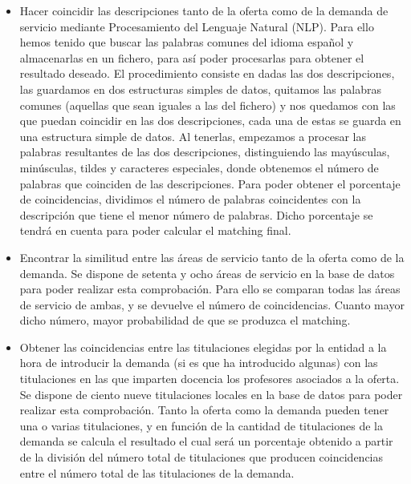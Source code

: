 \documentclass[11pt]{article}
\begin{document}
 \begin{itemize} 	
 	\item Hacer coincidir las descripciones tanto de la oferta como de la demanda de servicio mediante Procesamiento del Lenguaje Natural (NLP).
 Para ello hemos tenido que buscar las palabras comunes del idioma español y almacenarlas en un fichero, para así poder  procesarlas para obtener el resultado deseado. El procedimiento consiste en dadas las dos descripciones, las guardamos en dos estructuras simples de datos, quitamos las palabras comunes (aquellas que sean iguales a las del fichero) y nos quedamos con las que puedan coincidir en las dos descripciones, cada una de estas se guarda en una estructura simple de datos. Al tenerlas, empezamos a procesar las palabras resultantes de las dos descripciones, distinguiendo las mayúsculas, minúsculas, tildes y caracteres especiales, donde obtenemos el número de palabras que coinciden de las descripciones. Para poder obtener el porcentaje de coincidencias, dividimos el número de palabras coincidentes con la descripción que tiene el menor número de palabras. Dicho porcentaje se tendrá en cuenta para poder calcular el matching final.
 
 	\item Encontrar la similitud entre las áreas de servicio tanto de la oferta como de la demanda. Se dispone de setenta y ocho áreas de servicio en la base de datos para poder realizar esta comprobación. Para ello se comparan todas las áreas de servicio de ambas, y se devuelve el número de coincidencias. Cuanto mayor dicho número, mayor probabilidad de que se produzca el matching.
 
 	\item Obtener las coincidencias entre las titulaciones elegidas por la entidad a la hora de introducir la demanda (si es que ha introducido algunas) con las titulaciones en las que imparten docencia los profesores asociados a la oferta. 
 Se dispone de ciento nueve titulaciones locales en la base de datos para poder realizar esta comprobación. Tanto la oferta como la demanda pueden tener una o varias titulaciones, y en función de la cantidad de titulaciones de la demanda se calcula el resultado el cual será un porcentaje obtenido a partir de la división del número total de titulaciones que producen coincidencias entre el  número total de las titulaciones de la demanda.
 

\end{itemize}
\end{document}
